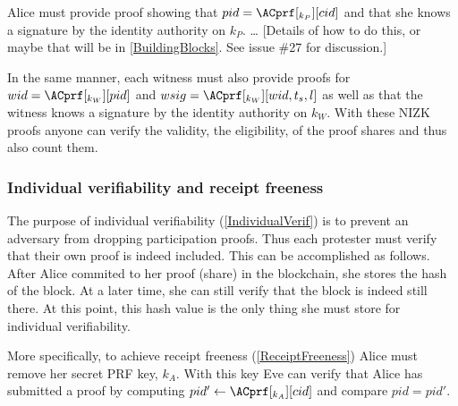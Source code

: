 Alice must provide  proof showing that \(pid = \ACprf[_{k_P}][cid]\) 
and that she knows a signature by the identity authority on \(k_P\).
\dots
[Details of how to do this, or maybe that will be in \cref{BuildingBlocks}. See 
issue \#27 for discussion.]

In the same manner, each witness must also provide  proofs for \(wid = 
  \ACprf[_{k_W}][pid]\) and \(wsig = \ACprf[_{k_W}][wid, t_s, l]\) as well as 
that the witness knows a signature by the identity authority on \(k_W\).
With these \ac{NIZK} proofs anyone can verify the validity, \ie the 
eligibility, of the proof shares and thus also count them.

\subsubsection{Individual verifiability and receipt freeness}

The purpose of individual verifiability (\cref{IndividualVerif}) is to prevent 
an adversary from dropping participation proofs.
Thus each protester must verify that their own proof is indeed included.
This can be accomplished as follows.
After Alice commited to her proof (share) in the blockchain, she stores the hash 
of the block.
At a later time, she can still verify that the block is indeed still there.
At this point, this hash value is the only thing she must store for individual 
verifiability.

More specifically, to achieve receipt freeness (\cref{ReceiptFreeness}) Alice 
must remove her secret \ac{PRF} key, \(k_A\).
With this key Eve can verify that Alice has submitted a proof by computing 
\(pid'\gets \ACprf[_{k_A}][cid]\) and compare \(pid = pid'\).
